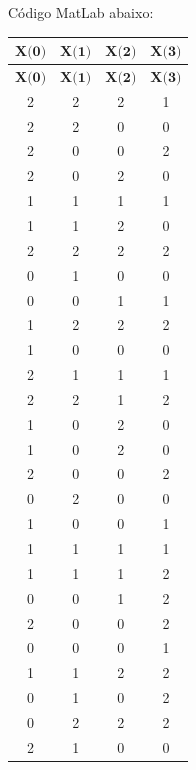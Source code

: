 \documentclass[12pt]{article}
\newenvironment{exercise}[2][Exercício]{\begin{trivlist}
\item[\hskip \labelsep {\bfseries #1}\hskip \labelsep {\bfseries #2.}]}{\end{trivlist}}
\begin{document}
\begin{exercise}{1.c} Código MatLab abaixo:
 

\begin{longtable}{cccc} $\textbf{X(0)}$ & $\textbf{X(1)}$ & $\textbf{X(2)}$ &
$\textbf{X(3)}$\\ \endfirsthead $\textbf{X(0)}$ & $\textbf{X(1)}$ & $\textbf{X(2)}$ &
$\textbf{X(3)}$\\
\endhead
2      & 2      & 2      & 1      \\
2      & 2      & 0      & 0      \\
2      & 0      & 0      & 2      \\
2      & 0      & 2      & 0      \\
1      & 1      & 1      & 1      \\
1      & 1      & 2      & 0      \\
2      & 2      & 2      & 2      \\
0      & 1      & 0      & 0      \\
0      & 0      & 1      & 1      \\
1      & 2      & 2      & 2      \\
1      & 0      & 0      & 0      \\
2      & 1      & 1      & 1      \\
2      & 2      & 1      & 2      \\
1      & 0      & 2      & 0      \\
1      & 0      & 2      & 0      \\
2      & 0      & 0      & 2      \\
0      & 2      & 0      & 0      \\
1      & 0      & 0      & 1      \\
1      & 1      & 1      & 1      \\
1      & 1      & 1      & 2      \\
0      & 0      & 1      & 2      \\
2      & 0      & 0      & 2      \\
0      & 0      & 0      & 1      \\
1      & 1      & 2      & 2      \\
0      & 1      & 0      & 2      \\
0      & 2      & 2      & 2      \\
2      & 1      & 0      & 0      \\

\end{longtable}
\end{exercise}
\end{document}
